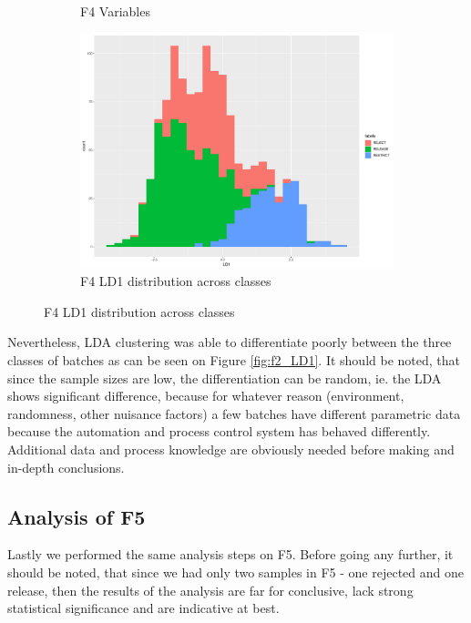 \begin{figure}
\begin{subfigure}{0.3\textwidth}
\begin{center}
        \end{center}
        \caption{F4 Variables}
        \label{fig:f4_variables}
    \end{subfigure}%
    \begin{subfigure}{0.3\textwidth}
        \begin{center}
        \includegraphics[width=\textwidth]{plots/f4_LD1.pdf}
        \end{center}
        \caption{F4 LD1 distribution across classes}
        \label{fig:f4_LD1}
    \end{subfigure}
\end{figure}

Nevertheless, LDA clustering was able to differentiate poorly between the three classes of batches as can be seen on Figure \ref{fig:f2_LD1}. It should be noted, that since the sample sizes are low, the differentiation can be random, ie. the LDA shows significant difference, because for whatever reason (environment, randomness, other nuisance factors) a few batches have different parametric data because the automation and process control system has behaved differently. Additional data and process knowledge are obviously needed before making and in-depth conclusions.

\subsection{Analysis of F5}
Lastly we performed the same analysis steps on F5. Before going any further, it should be noted, that since we had only two samples in F5 - one rejected and one release, then the results of the analysis are far for conclusive, lack strong statistical significance and are indicative at best. 


